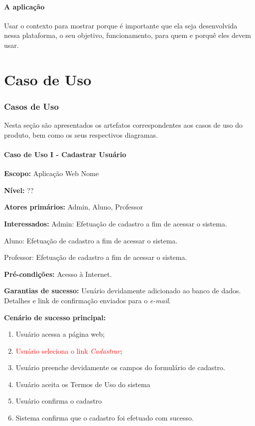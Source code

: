 \documentclass[12pt,oneside,a4paper,article]{abntex2}
\begin{document}
		\subsection{A aplicação}
			Usar o contexto para mostrar porque é importante que ela seja desenvolvida nessa plataforma, o seu objetivo, funcionamento, para quem e porquê eles devem usar.
\part{Caso de Uso}
	\section{Casos de Uso}
		Nesta seção são apresentados os artefatos correspondentes aos casos de uso do produto, bem como os seus respectivos diagramas.
		
		\subsection{Caso de Uso I - Cadastrar Usuário}
		
		\textbf{Escopo:} Aplicação Web Nome
		
		\textbf{Nível:} ??
		
		\textbf{Atores primários:} Admin, Aluno, Professor
		
		\textbf{Interessados:} Admin: Efetuação de cadastro a fim de acessar o sistema. 
		
		Aluno: Efetuação de cadastro a fim de acessar o sistema.
		
		Professor: Efetuação de cadastro a fim de acessar o sistema.
		
		\textbf{Pré-condições:} Acesso à Internet.
		
		\textbf{Garantias de sucesso:} Usuário devidamente adicionado ao banco de dados. Detalhes e link de confirmação enviados para o \textit{e-mail}.  
		
		\textbf{Cenário de sucesso principal:}
		
		\begin{enumerate}
			\item Usuário acessa a página web;
			
			\item \textcolor{red}{Usuário seleciona o link \textit{Cadastrar}};
			
			\item Usuário preenche devidamente os campos do formulário de cadastro.
			
			\item Usuário aceita os Termos de Uso do sistema
			
			\item Usuário confirma o cadastro
			
			\item Sistema confirma que o cadastro foi efetuado com sucesso.
		\end{enumerate}
		
\end{document}
